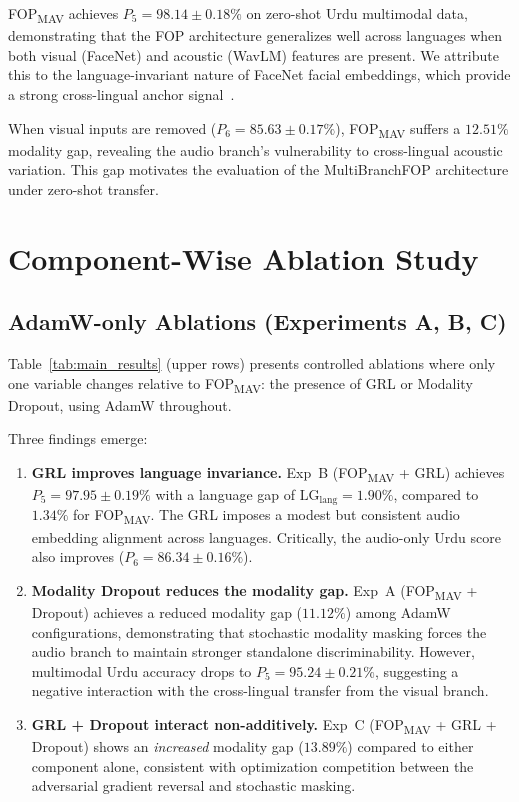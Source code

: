 \documentclass[conference]{IEEEtran}
\newcommand{\fopmav}{FOP\textsubscript{MAV}}
\begin{document}
\fopmav{} achieves $P_5 = 98.14 \pm 0.18\%$ on zero-shot Urdu multimodal data,
demonstrating that the FOP architecture generalizes well across languages
when both visual (FaceNet) and acoustic (WavLM) features are present.
We attribute this to the language-invariant nature of FaceNet facial embeddings,
which provide a strong cross-lingual anchor signal~\cite{schroff2015facenet}.

When visual inputs are removed ($P_6 = 85.63 \pm 0.17\%$), \fopmav{} suffers a $12.51\%$
modality gap, revealing the audio branch's vulnerability to cross-lingual
acoustic variation. This gap motivates the evaluation of the MultiBranchFOP
architecture under zero-shot transfer.

\section{Component-Wise Ablation Study}
\label{sec:ablation}

\subsection{AdamW-only Ablations (Experiments A, B, C)}

Table~\ref{tab:main_results} (upper rows) presents controlled ablations where
only one variable changes relative to \fopmav{}: the presence of GRL or
Modality Dropout, using AdamW throughout.

Three findings emerge:

\begin{enumerate}
\item \textbf{GRL improves language invariance.}
  Exp~B (\fopmav{} + GRL) achieves $P_5 = 97.95 \pm 0.19\%$ with a language gap of
  $\text{LG}_{\text{lang}} = 1.90\%$, compared to $1.34\%$ for \fopmav{}.
  The GRL imposes a modest but consistent audio embedding alignment across languages.
  Critically, the audio-only Urdu score also improves ($P_6 = 86.34 \pm 0.16\%$).

\item \textbf{Modality Dropout reduces the modality gap.}
  Exp~A (\fopmav{} + Dropout) achieves a reduced modality gap ($11.12\%$)
  among AdamW configurations, demonstrating that stochastic modality masking
  forces the audio branch to maintain stronger standalone discriminability.
  However, multimodal Urdu accuracy drops to $P_5 = 95.24 \pm 0.21\%$, suggesting a
  negative interaction with the cross-lingual transfer from the visual branch.

\item \textbf{GRL + Dropout interact non-additively.}
  Exp~C (\fopmav{} + GRL + Dropout) shows an \textit{increased} modality gap
  ($13.89\%$) compared to either component alone, consistent with optimization
  competition between the adversarial gradient reversal and stochastic masking.
\end{enumerate}
\end{document}
